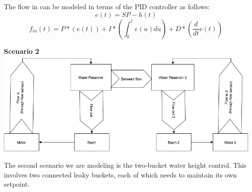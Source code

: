 \documentclass[11pt]{article}
\begin{document}
The flow in can be modeled in terms of the PID controller as follows:
$$e(t) = SP - h(t)$$
$$f_{in}(t) = P*(e(t)) + I*(\int_0^t e(u) du) + D*(\frac{d}{dt}e(t))$$
\bigskip
\begin{center}
{\bfseries \Large Scenario 2}\\
\bigskip
\includegraphics[scale=0.5]{Problem2}
\end{center}
\bigskip
The second scenario we are modeling is the two-bucket water height control.
This involves two connected leaky buckets, each of which needs to maintain its own setpoint.\\ \\
\end{document}
